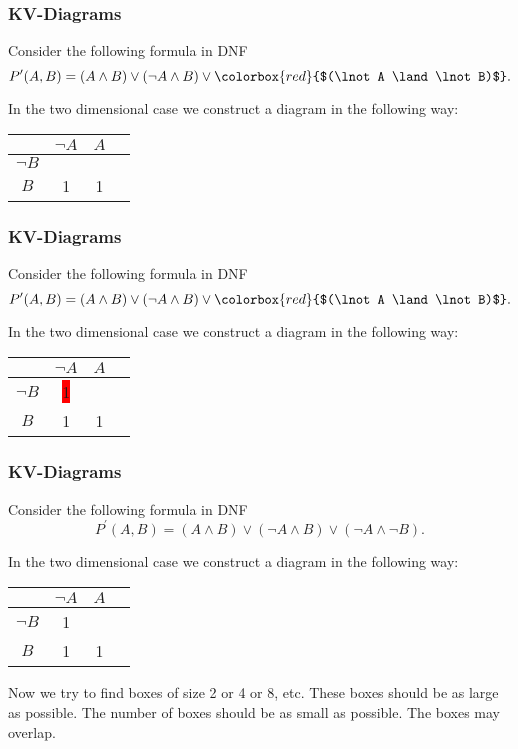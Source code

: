 \documentclass{beamer}
\theoremstyle{remark}
\begin{document}
\begin{frame}
	\frametitle{KV-Diagrams}
	Consider the following formula in DNF
	\[ P^{\prime}(A, B) = (A \land B) \lor (\lnot A \land B) \lor \colorbox{red}{$(\lnot A \land \lnot B)$}.\]
	
	In the two dimensional case we construct a diagram in the following way:
	
	\vspace{1.5em}
	
	\begin{center}
	\begin{tabular}{c|c|c|c}
		& $\lnot A$ & $A$ \\ \hline
		$\lnot B$ & &  \\ \hline
		$B$ & 1 &  1\\ \hline
	\end{tabular}
	\end{center}
\end{frame}

\begin{frame}
	\frametitle{KV-Diagrams}
	Consider the following formula in DNF
	\[ P^{\prime}(A, B) = (A \land B) \lor (\lnot A \land B) \lor \colorbox{red}{$(\lnot A \land \lnot B)$}.\]
	
	In the two dimensional case we construct a diagram in the following way:
	
	\vspace{1.5em}
	
	\begin{center}
	\begin{tabular}{c|c|c|c}
		& $\lnot A$ & $A$ \\ \hline
		$\lnot B$ & \colorbox{red}{1} &  \\ \hline
		$B$ & 1 &  1\\ \hline
	\end{tabular}
	\end{center}
\end{frame}

\begin{frame}
	\frametitle{KV-Diagrams}
	Consider the following formula in DNF
	\[ P^{\prime}(A, B) = (A \land B) \lor (\lnot A \land B) \lor (\lnot A \land \lnot B).\]
	
	In the two dimensional case we construct a diagram in the following way:
	
	\vspace{1.5em}
	
	\begin{center}
	\begin{tabular}{c|c|c|c}
		& $\lnot A$ & $A$ \\ \hline
		$\lnot B$ & 1 &  \\ \hline
		$B$ & 1 &  1\\ \hline
	\end{tabular}
	\end{center}
	
	Now we try to find boxes of size 2 or 4 or 8, etc. These boxes should be as large as possible. The number of boxes should be as small as possible. The boxes may overlap.
\end{frame}
\end{document}
